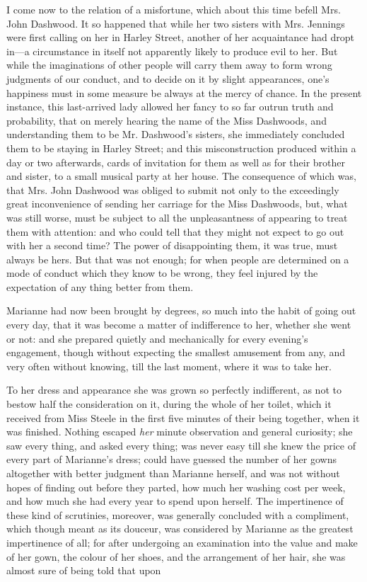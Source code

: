 I come now to the relation of a misfortune, which about this time befell Mrs. John Dashwood. It so happened that while her two sisters with Mrs. Jennings were first calling on her in Harley Street, another of her acquaintance had dropt in---a circumstance in itself not apparently likely to produce evil to her. But while the imaginations of other people will carry them away to form wrong judgments of our conduct, and to decide on it by slight appearances, one's happiness must in some measure be always at the mercy of chance. In the present instance, this last-arrived lady allowed her fancy to so far outrun truth and probability, that on merely hearing the name of the Miss Dashwoods, and understanding them to be Mr. Dashwood's sisters, she immediately concluded them to be staying in Harley Street; and this misconstruction produced within a day or two afterwards, cards of invitation for them as well as for their brother and sister, to a small musical party at her house. The consequence of which was, that Mrs. John Dashwood was obliged to submit not only to the exceedingly great inconvenience of sending her carriage for the Miss Dashwoods, but, what was still worse, must be subject to all the unpleasantness of appearing to treat them with attention: and who could tell that they might not expect to go out with her a second time? The power of disappointing them, it was true, must always be hers. But that was not enough; for when people are determined on a mode of conduct which they know to be wrong, they feel injured by the expectation of any thing better from them.

Marianne had now been brought by degrees, so much into the habit of going out every day, that it was become a matter of indifference to her, whether she went or not: and she prepared quietly and mechanically for every evening's engagement, though without expecting the smallest amusement from any, and very often without knowing, till the last moment, where it was to take her.

To her dress and appearance she was grown so perfectly indifferent, as not to bestow half the consideration on it, during the whole of her toilet, which it received from Miss Steele in the first five minutes of their being together, when it was finished. Nothing escaped {\em her} minute observation and general curiosity; she saw every thing, and asked every thing; was never easy till she knew the price of every part of Marianne's dress; could have guessed the number of her gowns altogether with better judgment than Marianne herself, and was not without hopes of finding out before they parted, how much her washing cost per week, and how much she had every year to spend upon herself. The impertinence of these kind of scrutinies, moreover, was generally concluded with a compliment, which though meant as its douceur, was considered by Marianne as the greatest impertinence of all; for after undergoing an examination into the value and make of her gown, the colour of her shoes, and the arrangement of her hair, she was almost sure of being told that upon 

